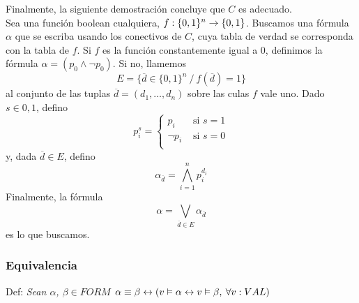 \documentclass[14pt,a4paper,fleqn]{article}
\begin{document}
Finalmente, la siguiente demostración concluye que $C$ es adecuado.\\
Sea una función boolean cualquiera, $f: \{0,1\}^n \rightarrow \{0,1\}$. Buscamos una fórmula $\alpha$ que se escriba usando los conectivos de $C$, cuya tabla de verdad se corresponda con la tabla de $f$. Si $f$ es la función constantemente igual a 0, definimos la fórmula $\alpha= ( p_{0} \wedge \neg p_{0} )$. Si no, llamemos
\begin{equation*}
	E = \{ \overline{d} \in \{0,1\}^n \: / \: f(\overline{d}) = 1 \}
\end{equation*}
al conjunto de las tuplas $ \overline{d} = (d_{1}, \dotsc, d_{n})$ sobre las culas $f$ vale uno. Dado $s \in {0,1}$, defino 
\[
	p_{i}^{s}	= 
	\left \{
	\begin{array}{rl}
		p_{i} & \text{ si } s=1 \\
		\neg p_{i} & \text{ si } s=0 \\		
	\end{array}
	\right.
\]
y, dada $\overline{d} \in E$, defino
\begin{equation*}
	\alpha_{\overline{d}} = \bigwedge_{i=1}^{n} p_{i}^{d_{i}}
\end{equation*}
Finalmente, la fórmula
\begin{equation*}
	\alpha = \bigvee_{\overline{d} \in E} \alpha_{\overline{d}}
\end{equation*}
es lo que buscamos.

\subsubsection*{Equivalencia}
Def: \emph{Sean $\alpha$, $\beta \in FORM$ $\alpha \equiv \beta \leftrightarrow (v \vDash \alpha \leftrightarrow v \vDash \beta ,\: \forall v: VAL)$}
\end{document}
